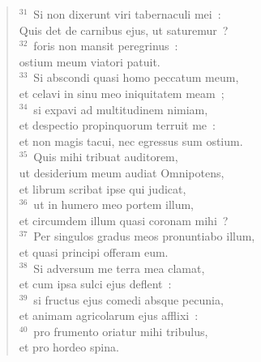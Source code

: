 \begin{flushleft}
\begin{verse}
${}^{31}$~Si non dixerunt viri tabernaculi mei~:\\ Quis det de carnibus ejus, ut saturemur~?\\
${}^{32}$~foris non mansit peregrinus~:\\ ostium meum viatori patuit.\\
${}^{33}$~Si abscondi quasi homo peccatum meum,\\ et celavi in sinu meo iniquitatem meam~;\\
${}^{34}$~si expavi ad multitudinem nimiam,\\ et despectio propinquorum terruit me~:\\ et non magis tacui, nec egressus sum ostium.\\
${}^{35}$~Quis mihi tribuat auditorem,\\ ut desiderium meum audiat Omnipotens,\\ et librum scribat ipse qui judicat,\\
${}^{36}$~ut in humero meo portem illum,\\ et circumdem illum quasi coronam mihi~?\\
${}^{37}$~Per singulos gradus meos pronuntiabo illum,\\ et quasi principi offeram eum.\\
${}^{38}$~Si adversum me terra mea clamat,\\ et cum ipsa sulci ejus deflent~:\\
${}^{39}$~si fructus ejus comedi absque pecunia,\\ et animam agricolarum ejus afflixi~:\\
${}^{40}$~pro frumento oriatur mihi tribulus,\\ et pro hordeo spina.\end{verse}\end{flushleft}

